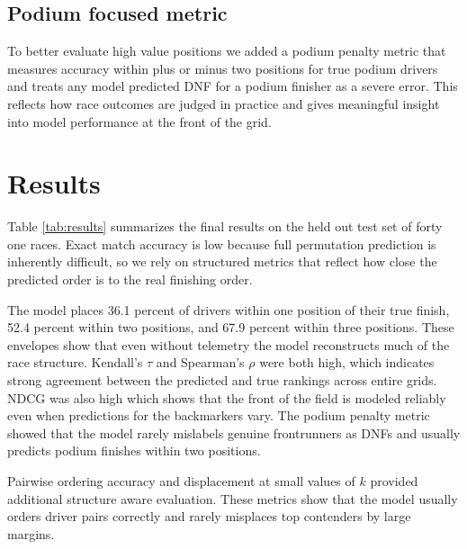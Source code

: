 \documentclass[12pt]{article}
\begin{document}
\subsection*{Podium focused metric}

To better evaluate high value positions we added a podium penalty metric that measures accuracy within plus or minus two positions for true podium drivers and treats any model predicted DNF for a podium finisher as a severe error. This reflects how race outcomes are judged in practice and gives meaningful insight into model performance at the front of the grid.

\section{Results}

Table \ref{tab:results} summarizes the final results on the held out test set of forty one races. Exact match accuracy is low because full permutation prediction is inherently difficult, so we rely on structured metrics that reflect how close the predicted order is to the real finishing order.

The model places 36.1 percent of drivers within one position of their true finish, 52.4 percent within two positions, and 67.9 percent within three positions. These envelopes show that even without telemetry the model reconstructs much of the race structure. Kendall's \(\tau\) and Spearman's \(\rho\) were both high, which indicates strong agreement between the predicted and true rankings across entire grids. NDCG was also high which shows that the front of the field is modeled reliably even when predictions for the backmarkers vary. The podium penalty metric showed that the model rarely mislabels genuine frontrunners as DNFs and usually predicts podium finishes within two positions.

Pairwise ordering accuracy and displacement at small values of \(k\) provided additional structure aware evaluation. These metrics show that the model usually orders driver pairs correctly and rarely misplaces top contenders by large margins.
\end{document}
